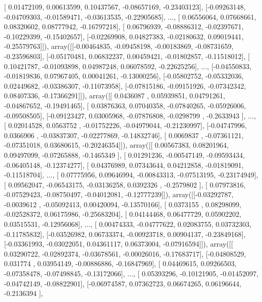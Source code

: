 \documentclass{article}
\begin{document}
       [ 0.01472109,  0.00613599,  0.10437567, -0.08657169, -0.23403123],
       [-0.09263148, -0.04709303, -0.01589471, -0.03613535, -0.22905685],
       ..., 
       [ 0.06556064,  0.07668661,  0.08320602,  0.08777942, -0.16797218],
       [ 0.06796939, -0.08886312, -0.02397671, -0.10229399, -0.15402657],
       [-0.02269908,  0.04827383, -0.02180632,  0.09019441, -0.25579763]]), array([[-0.00464835, -0.09458198, -0.00183869, -0.08731659, -0.23596803],
       [-0.05170481,  0.06832237,  0.00459421, -0.01802857, -0.11518012],
       [ 0.10421787, -0.01093898,  0.04987248,  0.06078592, -0.22625256],
       ..., 
       [-0.04550833, -0.01819836,  0.07967405,  0.00041261, -0.13000256],
       [-0.05802752, -0.05332036,  0.02449682, -0.03386307, -0.11073958],
       [-0.07815186, -0.09151926, -0.07342342,  0.08407336, -0.17366291]]), array([[ 0.0436087 ,  0.05939851,  0.04791261, -0.04867652, -0.19491465],
       [ 0.03876363,  0.07040358, -0.07840265, -0.05926006, -0.09508505],
       [-0.09123427,  0.03005968, -0.07876808, -0.0298799 , -0.2633943 ],
       ..., 
       [ 0.02014528,  0.0563752 , -0.01752226, -0.04979044, -0.21230997],
       [-0.04747996,  0.0366906 , -0.03837307, -0.02277869, -0.14832746],
       [ 0.0069837 , -0.07361121, -0.07351018,  0.03680615, -0.20246354]]), array([[ 0.00567383,  0.08201964,  0.09497099, -0.07265888, -0.1465349 ],
       [ 0.01291236, -0.00547149, -0.09593434, -0.06405148, -0.12374277],
       [ 0.04376989,  0.07343644,  0.04212858, -0.01819091, -0.11518704],
       ..., 
       [ 0.07775956,  0.09646994, -0.00843313, -0.07513195, -0.23174949],
       [ 0.09562047, -0.06543175, -0.03136258,  0.0392326 , -0.2579802 ],
       [ 0.07973816, -0.07529423, -0.08750497, -0.04012081, -0.12777239]]), array([[-0.03292787, -0.0039612 , -0.05092413,  0.00420094, -0.13570166],
       [ 0.0373155 ,  0.08298099, -0.02528372,  0.06175986, -0.25683204],
       [ 0.04144468,  0.06477729,  0.05902202,  0.03515531, -0.12956068],
       ..., 
       [ 0.00474333, -0.04777622,  0.02083755,  0.03732303, -0.11785832],
       [-0.03526982,  0.06733374, -0.00923718,  0.00904137, -0.23849168],
       [-0.03361993, -0.03022051,  0.04361117,  0.06373004, -0.07916594]]), array([[ 0.03290722, -0.02892374, -0.03678561, -0.00026016, -0.17683717],
       [-0.04808529,  0.031774  ,  0.03954149, -0.00886886, -0.16847969],
       [ 0.04469615,  0.09266503, -0.07358478, -0.07498845, -0.13172066],
       ..., 
       [ 0.05393296, -0.10121905, -0.01452097, -0.04742149, -0.08822901],
       [-0.06974587,  0.07362723,  0.06674265,  0.06196644, -0.2136394 ],
\end{document}
